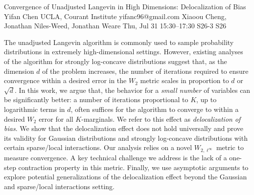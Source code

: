\begin{talk}
  {Convergence of Unadjusted Langevin in High Dimensions: Delocalization of Bias}%
  {Yifan Chen}%
  {UCLA, Courant Institute}%
  {yifanc96@gmail.com}%
  {Xiaoou Cheng, Jonathan Niles-Weed, Jonathan Weare}%
  {}%
  {Thu, Jul 31 15:30–17:30}%
  {S26-3}%
  {S26}%
  
				
			
The unadjusted Langevin algorithm is commonly used to sample probability distributions in extremely high-dimensional settings. However, existing analyses of the algorithm for strongly log-concave distributions suggest that, as the dimension $d$ of the problem increases, the number of iterations required to ensure convergence within a desired error in the $W_2$ metric scales in proportion to $d$ or $\sqrt{d}$. In this work, we argue that, the behavior for a \emph{small number} of variables can be significantly better: a number of iterations proportional to $K$, up to logarithmic terms in $d$,
often suffices for the algorithm to converge to within a desired $W_2$ error for all $K$-marginals.
We refer to this effect as 
\textit{delocalization of bias}. 
We show that the delocalization effect does not hold universally and prove its validity for Gaussian distributions and strongly log-concave distributions with certain sparse/local interactions. Our analysis relies on a novel $W_{2,\ell^\infty}$ metric to measure convergence. A key technical challenge we address is the lack of a one-step contraction property in this metric. Finally, we use asymptotic arguments to explore potential generalizations of the delocalization effect beyond the Gaussian and sparse/local interactions setting.

\end{talk}

